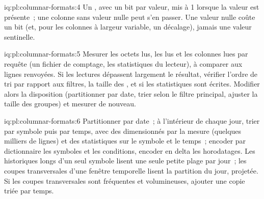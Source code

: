 \begin{solution}{iq:pl:columnar-formats:4}
Un , avec un bit par valeur, mis à 1 lorsque la valeur est présente~; une colonne sans valeur nulle peut s'en passer. Une valeur nulle coûte un bit (et, pour
les colonnes à largeur variable, un décalage), jamais une valeur sentinelle.
\end{solution}

\begin{solution}{iq:pl:columnar-formats:5}
Mesurer les octets lus, les  lus et les colonnes lues par requête (un fichier de comptage, les statistiques du lecteur), à comparer aux lignes
renvoyées. Si les lectures dépassent largement le résultat, vérifier l'ordre de tri par rapport aux filtres, la taille des , et si
les statistiques sont écrites. Modifier alors la disposition (partitionner par date, trier selon le filtre principal, ajuster la taille des groupes) et mesurer de nouveau.
\end{solution}

\begin{solution}{iq:pl:columnar-formats:6}
Partitionner par date~; à l'intérieur de chaque jour, trier par symbole puis par temps, avec des  dimensionnés par la mesure (quelques milliers de lignes) et
des statistiques sur le symbole et le temps~; encoder par dictionnaire les symboles et les conditions, encoder en delta les horodatages. Les historiques longs d'un seul symbole
lisent une seule petite plage par jour~; les coupes transversales d'une fenêtre temporelle lisent la partition du jour, projetée. Si les coupes transversales sont
fréquentes et volumineuses, ajouter une copie triée par temps.
\end{solution}
